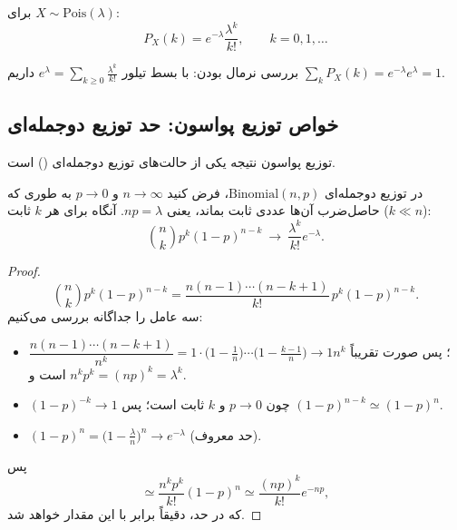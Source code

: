 \begin{definition}
برای $X\sim\mathrm{Pois}(\lambda)$:
\[
\boxed{\ P_X(k)=e^{-\lambda}\frac{\lambda^k}{k!},\qquad k=0,1,\ldots\ }
\]
\end{definition}
بررسی نرمال بودن: با بسط تیلور $e^\lambda=\sum_{k\ge0}\frac{\lambda^k}{k!}$ داریم $\sum_kP_X(k)=e^{-\lambda}e^{\lambda}=1$.

\begin{center}
\end{center}

\subsection{خواص توزیع پواسون: حد توزیع دوجمله‌ای}
توزیع پواسون نتیجه یکی از حالت‌های توزیع دوجمله‌ای () است.

\begin{theorem}
در توزیع دوجمله‌ای $\mathrm{Binomial}(n,p)$، فرض کنید $n\to\infty$ و $p\to0$ به طوری که حاصل‌ضرب آن‌ها عددی ثابت بماند، یعنی $np=\lambda$. آنگاه برای هر $k$ ثابت ($k\ll n$):
\[
\binom nk p^k(1-p)^{n-k}\ \longrightarrow\ \frac{\lambda^k}{k!}e^{-\lambda}.
\]
\end{theorem}
\begin{proof}
\[
\binom nk p^k(1-p)^{n-k}=\frac{n(n-1)\cdots(n-k+1)}{k!}\,p^k(1-p)^{n-k}.
\]
سه عامل را جداگانه بررسی می‌کنیم:
\begin{itemize}
\item $\dfrac{n(n-1)\cdots(n-k+1)}{n^k}=1\cdot\big(1-\tfrac1n\big)\cdots\big(1-\tfrac{k-1}{n}\big)\to1$؛ پس صورت تقریباً $n^k$ است و $n^kp^k=(np)^k=\lambda^k$.
\item $(1-p)^{-k}\to1$ چون $p\to0$ و $k$ ثابت است؛ پس $(1-p)^{n-k}\simeq(1-p)^n$.
\item $(1-p)^n=\big(1-\frac\lambda n\big)^n\to e^{-\lambda}$ (حد معروف).
\end{itemize}
پس
\[
\simeq\frac{n^kp^k}{k!}(1-p)^n\simeq\frac{(np)^k}{k!}e^{-np},
\]
که در حد، دقیقاً برابر با این مقدار خواهد شد.
\end{proof}

